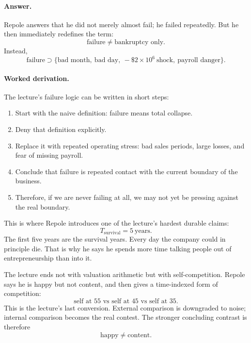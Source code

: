 \paragraph{Answer.}
Repole answers that he did not merely almost fail; he failed repeatedly. But he then immediately redefines the term:
\begin{equation}
\text{failure} \neq \text{bankruptcy only}.
\end{equation}
Instead,
\begin{equation}
\text{failure} \supset \{\text{bad month},\ \text{bad day},\ -\$2\times 10^6\ \text{shock},\ \text{payroll danger}\}.
\end{equation}

\paragraph{Worked derivation.}
The lecture's failure logic can be written in short steps:
\begin{enumerate}
\item Start with the naive definition: failure means total collapse.
\item Deny that definition explicitly.
\item Replace it with repeated operating stress: bad sales periods, large losses, and fear of missing payroll.
\item Conclude that failure is repeated contact with the current boundary of the business.
\item Therefore, if we are never failing at all, we may not yet be pressing against the real boundary.
\end{enumerate}

This is where Repole introduces one of the lecture's hardest durable claims:
\begin{equation}
T_{\mathrm{survival}} = 5\ \text{years}.
\end{equation}
The first five years are the survival years. Every day the company could in principle die. That is why he says he spends more time talking people out of entrepreneurship than into it.

The lecture ends not with valuation arithmetic but with self-competition. Repole says he is happy but not content, and then gives a time-indexed form of competition:
\begin{equation}
\text{self at }55 \text{ vs self at }45 \text{ vs self at }35.
\end{equation}
This is the lecture's last conversion. External comparison is downgraded to noise; internal comparison becomes the real contest. The stronger concluding contrast is therefore
\begin{equation}
\text{happy} \neq \text{content}.
\end{equation}

